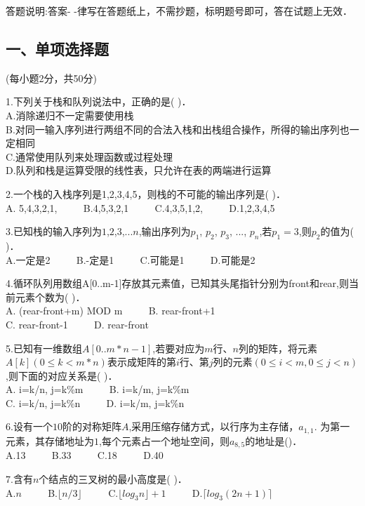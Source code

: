 
答题说明:答案- -律写在答题纸上，不需抄题，标明题号即可，答在试题上无效．

\subsection{一、单项选择题}
(每小题2分，共50分)

1.下列关于栈和队列说法中，正确的是(    )． \\
A.消除递归不一定需要使用栈 \\
B.对同一输入序列进行两组不同的合法入栈和出栈组合操作，所得的输出序列也一定相同 \\
C.通常使用队列来处理函数或过程处理 \\
D.队列和栈是运算受限的线性表，只允许在表的两端进行运算

2.一个栈的入栈序列是1,2,3,4,5，则栈的不可能的输出序列是( )． \\
A. 5,4,3,2,1,  $\qquad$ B.4,5,3,2,1 $\qquad$ C.4,3,5,1,2, $\qquad$ D.1,2,3,4,5

3.已知栈的输入序列为$1$,$2$,$3$,...$n$,输出序列为$p_1$, $p_2$, $p_3$, ..., $p_n$,若$p_1=3$,则$p_2$的值为(    )． \\
A.一定是2 $\qquad$ B.-定是1 $\qquad$ C.可能是1 $\qquad$ D.可能是2

4.循环队列用数组A[0..m-1]存放其元素值，已知其头尾指针分别为front和rear,则当前元素个数为( )． \\
A. (rear-front+m) MOD m $\qquad$ B. rear-front+1 \\
C. rear-front-1 $\qquad$ D. rear-front

5.已知有一维数组$A[0..m*n-1]$,若要对应为$m$行、$n$列的矩阵，将元素$A[k](0\leqslant k<m*n)$表示成矩阵的第$i$行、第$j$列的元素$(0\leqslant i<m, 0\leqslant j<n)$,则下面的对应关系是(    )． \\
A. i=k/n, j=k\%m $\qquad$ B. i=k/m, j=k\%m \\
C. i=k/n, j=k\%n $\qquad$ D. i=k/m, j=k\%n

6.设有一个$10$阶的对称矩阵$A$,采用压缩存储方式，以行序为主存储，$a_{1,1}$. 为第一元素，其存储地址为$1$,每个元素占一个地址空间，则$a_{8,5}$的地址是()． \\
A.13 $\qquad$ B.33 $\qquad$ C.18 $\qquad$ D.40

7.含有$n$个结点的三叉树的最小高度是(    )． \\
A.$n$ $\qquad$ B.$\lfloor n/3 \rfloor$ $\qquad$ C.$\lfloor log_3n\rfloor+1$ $\qquad$ D.$\lceil log_3(2n+1)\rceil$

